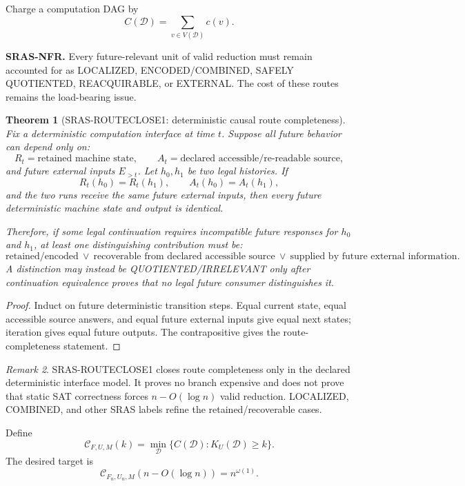 \documentclass[11pt]{article}
\theoremstyle{plain}
\newtheorem{theorem}{Theorem}[section]
\theoremstyle{definition}
\theoremstyle{remark}
\newtheorem{remark}[theorem]{Remark}
\begin{document}
Charge a computation DAG by
\[
\boxed{
C(\mathcal D)=\sum_{v\in V(\mathcal D)}c(v).
}
\]

\begin{candidatebox}
\textbf{SRAS-NFR.}
Every future-relevant unit of valid reduction must remain accounted for as
LOCALIZED, ENCODED/COMBINED, SAFELY QUOTIENTED, REACQUIRABLE, or EXTERNAL.
The cost of these routes remains the load-bearing issue.
\end{candidatebox}

\begin{theorem}[SRAS-ROUTECLOSE1: deterministic causal route completeness]
Fix a deterministic computation interface at time $t$. Suppose all future
behavior can depend only on:
\[
R_t=\text{retained machine state},\qquad
A_t=\text{declared accessible/re-readable source},
\]
and future external inputs $E_{>t}$.
Let $h_0,h_1$ be two legal histories. If
\[
R_t(h_0)=R_t(h_1),\qquad
A_t(h_0)=A_t(h_1),
\]
and the two runs receive the same future external inputs, then every future
deterministic machine state and output is identical.

Therefore, if some legal continuation requires incompatible future responses
for $h_0$ and $h_1$, at least one distinguishing contribution must be:
\[
\boxed{
\text{retained/encoded}
\ \vee\
\text{recoverable from declared accessible source}
\ \vee\
\text{supplied by future external information}.
}
\]
A distinction may instead be QUOTIENTED/IRRELEVANT only after continuation
equivalence proves that no legal future consumer distinguishes it.
\end{theorem}

\begin{proof}
Induct on future deterministic transition steps. Equal current state, equal
accessible source answers, and equal future external inputs give equal next
states; iteration gives equal future outputs. The contrapositive gives the
route-completeness statement.
\end{proof}

\begin{remark}
SRAS-ROUTECLOSE1 closes route completeness only in the declared deterministic
interface model. It proves no branch expensive and does not prove that static
SAT correctness forces $n-O(\log n)$ valid reduction. LOCALIZED, COMBINED, and
other SRAS labels refine the retained/recoverable cases.
\end{remark}

Define
\[
\boxed{
\mathcal C_{F,U,M}(k)
=
\min_{\mathcal D}
\{C(\mathcal D):K_U(\mathcal D)\ge k\}.
}
\]
The desired target is
\[
\boxed{
\mathcal C_{F_n,U_n,M}(n-O(\log n))=n^{\omega(1)}.
}
\]
\end{document}
